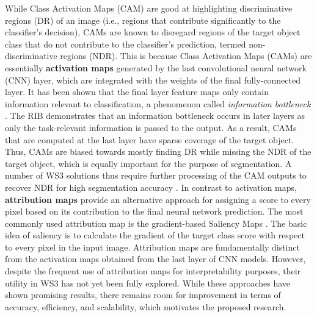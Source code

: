 \documentclass[11pt]{article}
\begin{document}
While Class Activation Maps (CAM) are good at highlighting discriminative regions (DR) of an image (i.e., regions that contribute significantly to the classifier’s decision), CAMs are known to disregard regions of the target object class that do not contribute to the classifier’s prediction, termed non-discriminative regions (NDR). This is because Class Activation Maps (CAMs) are essentially \textbf{activation maps} generated by the last convolutional neural network (CNN) layer, which are integrated with the weights of the final fully-connected layer. It has been shown that the final layer feature maps only contain information relevant to classification, a phenomenon called \textit{information bottleneck} \cite{lee2021reducing}. The RIB \cite{lee2021reducing} demonstrates that an information bottleneck occurs in later layers as only the task-relevant information is passed to the output. As a result, CAMs that are computed at the last layer have sparse coverage of the target object. Thus, CAMs are biased towards mostly finding DR while missing the NDR of the target object, which is equally important for the purpose of segmentation. A number of WS3 solutions thus require further processing of the CAM outputs to recover NDR for high segmentation accuracy \cite{li2018tell, hou2018self}. \newline
In contrast to activation maps, \textbf{attribution maps} provide an alternative approach for assigning a score to every pixel based on its contribution to the final neural network prediction. The most commonly used attribution map is the gradient-based Saliency Maps \cite{simonyan2013deep}. The basic idea of saliency is to calculate the gradient of the target class score with respect to every pixel in the input image. Attribution maps are fundamentally distinct from the activation maps obtained from the last layer of CNN models. However, despite the frequent use of attribution maps for interpretability purposes, their utility in WS3 has not yet been fully explored. \newline
While these approaches have shown promising results, there remains room for improvement in terms of accuracy, efficiency, and scalability, which motivates the proposed research.
\end{document}
